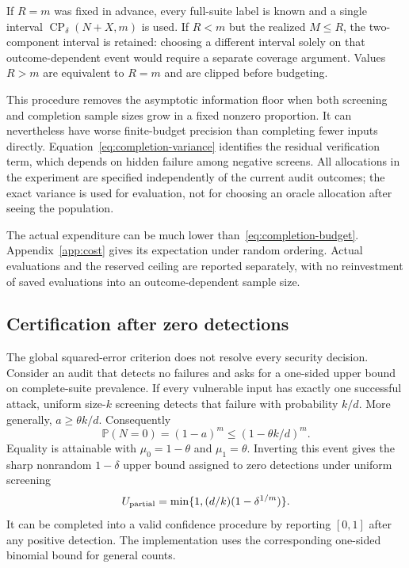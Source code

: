 \documentclass[conference]{IEEEtran}
\newcommand{\Prob}{\mathbb{P}}
\begin{document}
If $R=m$ was fixed in advance, every full-suite label is known and a single interval $\operatorname{CP}_\delta(N+X,m)$ is used. If $R<m$ but the realized $M\leq R$, the two-component interval is retained: choosing a different interval solely on that outcome-dependent event would require a separate coverage argument. Values $R>m$ are equivalent to $R=m$ and are clipped before budgeting.

This procedure removes the asymptotic information floor when both screening and completion sample sizes grow in a fixed nonzero proportion. It can nevertheless have worse finite-budget precision than completing fewer inputs directly. Equation~\eqref{eq:completion-variance} identifies the residual verification term, which depends on hidden failure among negative screens. All allocations in the experiment are specified independently of the current audit outcomes; the exact variance is used for evaluation, not for choosing an oracle allocation after seeing the population.

The actual expenditure can be much lower than~\eqref{eq:completion-budget}. Appendix~\ref{app:cost} gives its expectation under random ordering. Actual evaluations and the reserved ceiling are reported separately, with no reinvestment of saved evaluations into an outcome-dependent sample size.

\subsection{Certification after zero detections}\label{sec:zero}
The global squared-error criterion does not resolve every security decision. Consider an audit that detects no failures and asks for a one-sided upper bound on complete-suite prevalence. If every vulnerable input has exactly one successful attack, uniform size-$k$ screening detects that failure with probability $k/d$. More generally, $a\geq\theta k/d$. Consequently
\begin{equation}
 \Prob(N=0)=(1-a)^m\leq(1-\theta k/d)^m.
\end{equation}
Equality is attainable with $\mu_0=1-\theta$ and $\mu_1=\theta$. Inverting this event gives the sharp nonrandom $1-\delta$ upper bound assigned to zero detections under uniform screening
\begin{equation}\label{eq:zero-partial}
 U_{\rm partial}=\min\{1,(d/k)(1-\delta^{1/m})\}.
\end{equation}
It can be completed into a valid confidence procedure by reporting $[0,1]$ after any positive detection. The implementation uses the corresponding one-sided binomial bound for general counts.
\end{document}
